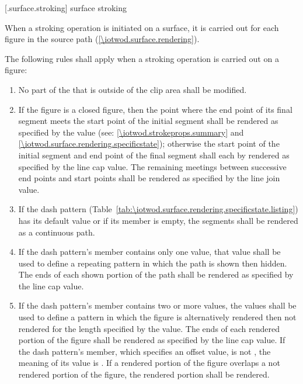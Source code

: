  [\iotwod.surface.stroking] {surface stroking}

\pnum
When a stroking operation is initiated on a surface, it is carried out for each figure in the source path (\ref{\iotwod.surface.rendering}).

\pnum
The following rules shall apply when a stroking operation is carried out on a figure:
\begin{enumerate}
\item No part of the \underlyingsurface that is outside of the clip area shall be modified.

\item If the figure is a closed figure, then the point where the end point of its final segment meets the start point of the initial segment shall be rendered as specified by the  value (see: \ref{\iotwod.strokeprops.summary} and \ref{\iotwod.surface.rendering.specificstate}); otherwise the start point of the initial segment and end point of the final segment shall each by rendered as specified by the line cap value. The remaining meetings between successive end points and start points shall be rendered as specified by the line join value.

\item If the dash pattern (Table~\ref{tab:\iotwod.surface.rendering.specificstate.listing}) has its default value or if its  member is empty, the segments shall be rendered as a continuous path.

\item If the dash pattern's  member contains only one value, that value shall be used to define a repeating pattern in which the path is shown then hidden. The ends of each shown portion of the path shall be rendered as specified by the line cap value.

\item If the dash pattern's  member contains two or more values, the values shall be used to define a pattern in which the figure is alternatively rendered then not rendered for the length specified by the value. The ends of each rendered portion of the figure shall be rendered as specified by the line cap value. If the dash pattern's  member, which specifies an offset value, is not , the meaning of its value is . If a rendered portion of the figure overlaps a not rendered portion of the figure, the rendered portion shall be rendered.
\end{enumerate}

